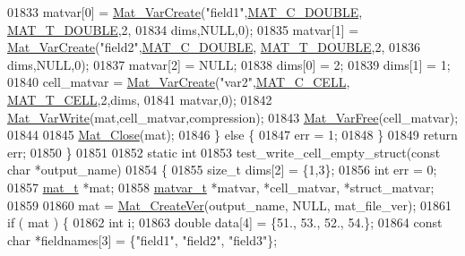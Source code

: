 \begin{DoxyCode}
{{{{{01833         matvar[0] = \hyperlink{group___m_a_t_ga1c54a84bb4d810c6fccdb8869489eac4}{Mat\_VarCreate}(\textcolor{stringliteral}{"field1"},\hyperlink{group___m_a_t_ggad4d60ae7b709fc81bfd744fb4c857c40a5d70e0862e5bdb7bd86bf7ba5948f307}{MAT\_C\_DOUBLE},
      \hyperlink{group___m_a_t_ggacf7b3b879282b7ab3a51190e49bf3453a31e721ecf7e188196f83c32838288797}{MAT\_T\_DOUBLE},2,
01834                        dims,NULL,0);
01835         matvar[1] = \hyperlink{group___m_a_t_ga1c54a84bb4d810c6fccdb8869489eac4}{Mat\_VarCreate}(\textcolor{stringliteral}{"field2"},\hyperlink{group___m_a_t_ggad4d60ae7b709fc81bfd744fb4c857c40a5d70e0862e5bdb7bd86bf7ba5948f307}{MAT\_C\_DOUBLE},
      \hyperlink{group___m_a_t_ggacf7b3b879282b7ab3a51190e49bf3453a31e721ecf7e188196f83c32838288797}{MAT\_T\_DOUBLE},2,
01836                        dims,NULL,0);
01837         matvar[2] = NULL;
01838         dims[0] = 2;
01839         dims[1] = 1;
01840         cell\_matvar = \hyperlink{group___m_a_t_ga1c54a84bb4d810c6fccdb8869489eac4}{Mat\_VarCreate}(\textcolor{stringliteral}{"var2"},\hyperlink{group___m_a_t_ggad4d60ae7b709fc81bfd744fb4c857c40a2f7abb47a1c51e248bd4e5e03cc81b08}{MAT\_C\_CELL},
      \hyperlink{group___m_a_t_ggacf7b3b879282b7ab3a51190e49bf3453a07599cf2cca6d2b2d059378563318ba5}{MAT\_T\_CELL},2,dims,
01841                                     matvar,0);
01842         \hyperlink{group___m_a_t_ga4bd3eba12df415d8226e27c457fbbb0b}{Mat\_VarWrite}(mat,cell\_matvar,compression);
01843         \hyperlink{group___m_a_t_ga1d14716f7450530fd1c9d02413787f0e}{Mat\_VarFree}(cell\_matvar);
01844 
01845         \hyperlink{group___m_a_t_ga101c92ff7bde4a2d4615661beba09262}{Mat\_Close}(mat);
01846     \} \textcolor{keywordflow}{else} \{
01847         err = 1;
01848     \}
01849     \textcolor{keywordflow}{return} err;
01850 \}
01851 
01852 \textcolor{keyword}{static} \textcolor{keywordtype}{int}
01853 test\_write\_cell\_empty\_struct(\textcolor{keyword}{const} \textcolor{keywordtype}{char} *output\_name)
01854 \{
01855     \textcolor{keywordtype}{size\_t}  dims[2] = \{1,3\};
01856     \textcolor{keywordtype}{int}    err = 0;
01857     \hyperlink{struct__mat__t}{mat\_t}     *mat;
01858     \hyperlink{group___m_a_t_structmatvar__t}{matvar\_t} *matvar, *cell\_matvar, *struct\_matvar;
01859 
01860     mat = \hyperlink{group___m_a_t_ga22d404f203af7869c841400e7ad247cf}{Mat\_CreateVer}(output\_name, NULL, mat\_file\_ver);
01861     \textcolor{keywordflow}{if} ( mat ) \{
01862         \textcolor{keywordtype}{int} i;
01863         \textcolor{keywordtype}{double} data[4] = \{51., 53., 52., 54.\};
01864         \textcolor{keyword}{const} \textcolor{keywordtype}{char} *fieldnames[3] = \{\textcolor{stringliteral}{"field1"}, \textcolor{stringliteral}{"field2"}, \textcolor{stringliteral}{"field3"}\};
}}}}}
\end{DoxyCode}
